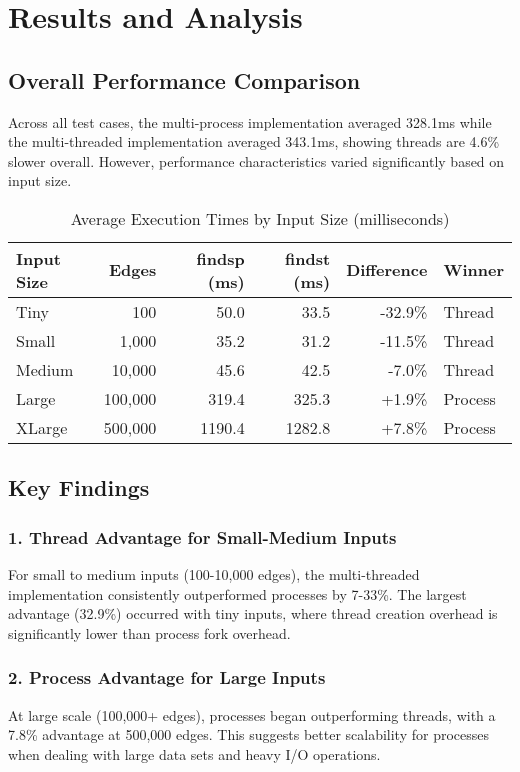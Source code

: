 \documentclass[11pt]{article}
\begin{document}
\section{Results and Analysis}

\subsection{Overall Performance Comparison}

Across all test cases, the multi-process implementation averaged 328.1ms while the multi-threaded implementation averaged 343.1ms, showing threads are 4.6\% slower overall. However, performance characteristics varied significantly based on input size.

\begin{table}[H]
\centering
\caption{Average Execution Times by Input Size (milliseconds)}
\begin{tabular}{lrrrrl}
\toprule
Input Size & Edges & findsp (ms) & findst (ms) & Difference & Winner \\
\midrule
Tiny & 100 & 50.0 & 33.5 & -32.9\% & Thread \\
Small & 1,000 & 35.2 & 31.2 & -11.5\% & Thread \\
Medium & 10,000 & 45.6 & 42.5 & -7.0\% & Thread \\
Large & 100,000 & 319.4 & 325.3 & +1.9\% & Process \\
XLarge & 500,000 & 1190.4 & 1282.8 & +7.8\% & Process \\
\bottomrule
\end{tabular}
\end{table}

\subsection{Key Findings}

\subsubsection{1. Thread Advantage for Small-Medium Inputs}
For small to medium inputs (100-10,000 edges), the multi-threaded implementation consistently outperformed processes by 7-33\%. The largest advantage (32.9\%) occurred with tiny inputs, where thread creation overhead is significantly lower than process fork overhead.

\subsubsection{2. Process Advantage for Large Inputs}
At large scale (100,000+ edges), processes began outperforming threads, with a 7.8\% advantage at 500,000 edges. This suggests better scalability for processes when dealing with large data sets and heavy I/O operations.
\end{document}
